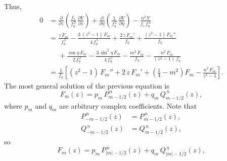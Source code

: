 \documentclass[12pt,prb,aps,notitlepage]{revtex4-1}
\begin{document}
Thus,
\begin{align}
0&=\frac{\partial}{\partial z}\!\left(\frac{f_z}{f_\eta^{\,2}}\,\frac{\partial V}{\partial z}\right)+ \frac{\partial}{\partial \eta}\!\left(\frac{1}{f_\eta^{\,2}}\,\frac{\partial V}{\partial \eta}\right)
-\frac{n^2\,V}{f_z\,f_\eta^{\,2}}\nonumber\\[0.5ex]&
= \frac{z\,F_m}{f_\eta^{\,3}} -\frac{3\,(z^2-1)\,F_m}{4\,f_\eta^{\,5}}
+\frac{2\,z\,F_m'}{f_\eta}
+\frac{(z^2-1)\,F_m''}{f_\eta}\nonumber\\[0.5ex]
&\phantom{=}+\frac{\cos\eta\,F_m}{2\,f_\eta^{\,3}}- \frac{3\,\sin^2\eta\,F_m}{4\,f_\eta^{\,5}} - \frac{m^2\,F_m}{f_\eta} -\frac{n^2\,F_m}{(z^2-1)\,f_\eta}\nonumber\\[0.5ex]
&=\frac{1}{f_\eta}\left[(z^2-1)\,F_m'' + 2\,z\,F_m' + \left(\frac{1}{4}-m^2\right)\!F_m - \frac{n^2\,F_m}{z^2-1}\right].
\end{align}
The most general solution of the previous equation is
\begin{equation}
F_m(z) = p_m\,P_{m-1/2}^{\,n}(z)+q_m\,Q_{m-1/2}^{\,n}(z),
\end{equation}
where $p_m$ and $q_m$ are arbitrary complex coefficients. 
Note that
\begin{align}
P_{-m-1/2}^{\,n}(z) &= P_{m-1/2}^{\,n}(z),\\[0.5ex]
Q_{-m-1/2}^{\,n}(z) &= Q_{m-1/2}^{\,n}(z),
\end{align}
so 
\begin{equation}
F_m(z) = p_m\,P_{|m|-1/2}^{\,n}(z)+q_m\,Q_{|m|-1/2}^{\,n}(z),
\end{equation}
\end{document}
